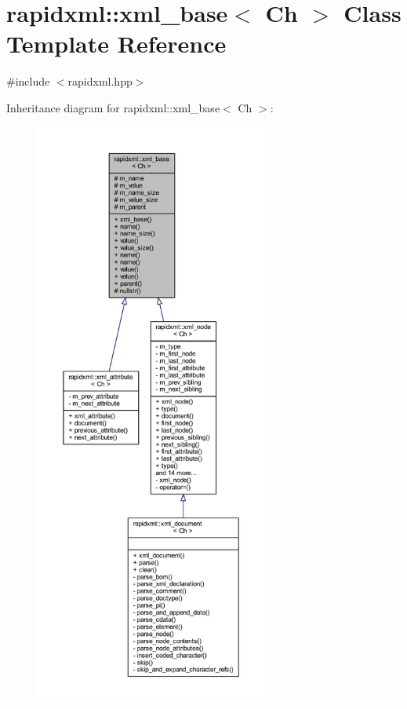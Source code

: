 \hypertarget{classrapidxml_1_1xml__base}{\section{rapidxml\+:\+:xml\+\_\+base$<$ Ch $>$ Class Template Reference}
\label{classrapidxml_1_1xml__base}
}


{\ttfamily \#include $<$rapidxml.\+hpp$>$}



Inheritance diagram for rapidxml\+:\+:xml\+\_\+base$<$ Ch $>$\+:\nopagebreak
\begin{figure}[H]
\begin{center}
\leavevmode
\includegraphics[height=550pt]{classrapidxml_1_1xml__base__inherit__graph}
\end{center}
\end{figure}


